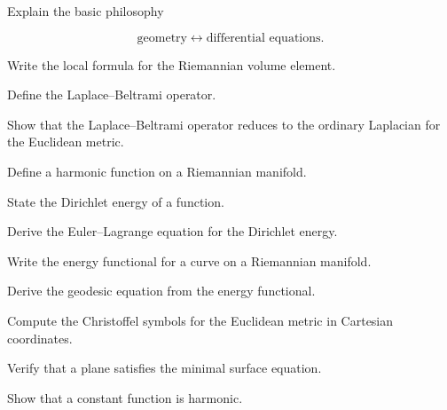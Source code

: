\begin{exercise}[1]
Explain the basic philosophy

\[
\text{geometry}
\longleftrightarrow
\text{differential equations}.
\]
\end{exercise}

\begin{exercise}[1]
Write the local formula for the Riemannian volume element.
\end{exercise}

\begin{exercise}[1]
Define the Laplace--Beltrami operator.
\end{exercise}

\begin{exercise}[1]
Show that the Laplace--Beltrami operator reduces to the ordinary
Laplacian for the Euclidean metric.
\end{exercise}

\begin{exercise}[1]
Define a harmonic function on a Riemannian manifold.
\end{exercise}

\begin{exercise}[1]
State the Dirichlet energy of a function.
\end{exercise}

\begin{exercise}[2]
Derive the Euler--Lagrange equation for the Dirichlet energy.
\end{exercise}

\begin{exercise}[2]
Write the energy functional for a curve on a Riemannian manifold.
\end{exercise}

\begin{exercise}[2]
Derive the geodesic equation from the energy functional.
\end{exercise}

\begin{exercise}[2]
Compute the Christoffel symbols for the Euclidean metric in Cartesian
coordinates.
\end{exercise}

\begin{exercise}[2]
Verify that a plane satisfies the minimal surface equation.
\end{exercise}

\begin{exercise}[2]
Show that a constant function is harmonic.
\end{exercise}

